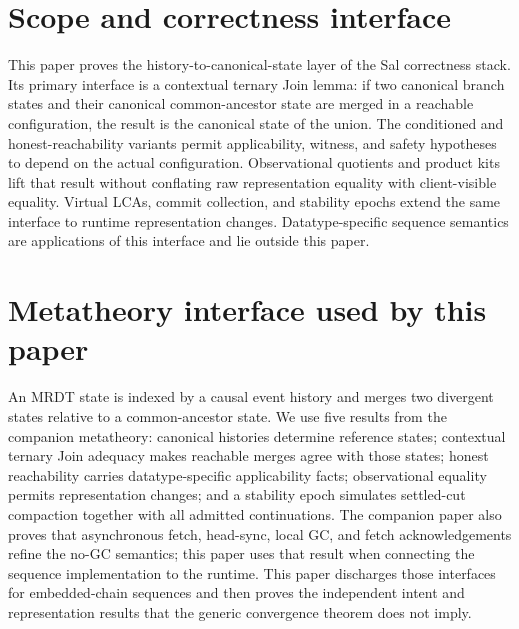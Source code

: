 \documentclass[11pt]{article}
\begin{document}
\ifdefined\salPaperA
\section*{Scope and correctness interface}
\label{sec:storage}
This paper proves the history-to-canonical-state layer of the Sal correctness
stack. Its primary interface is a contextual ternary Join lemma: if two
canonical branch states and their canonical common-ancestor state are merged
in a reachable configuration, the result is the canonical state of the union.
The conditioned and honest-reachability variants permit applicability,
witness, and safety hypotheses to depend on the actual configuration.
Observational quotients and product kits lift that result without conflating
raw representation equality with client-visible equality. Virtual LCAs,
commit collection, and stability epochs extend the same interface to runtime
representation changes. Datatype-specific sequence semantics are applications
of this interface and lie outside this paper.
\else\ifdefined\salPaperB
\section*{Metatheory interface used by this paper}
\label{def:delta}\label{def:honestreach}\label{fvc:cd}\label{fvc:lredist}
\label{sec:cvcs}\label{sec:gc}\label{sec:route}\label{sec:setting}
\label{sec:stability}\label{thm:evidence}\label{thm:gcsafety}
An MRDT state is indexed by a causal event history and merges two divergent
states relative to a common-ancestor state. We use five results from the
companion metatheory: canonical histories determine reference states;
contextual ternary Join adequacy makes reachable merges agree with those
states; honest reachability carries datatype-specific applicability facts;
observational equality permits representation changes; and a stability epoch
simulates settled-cut compaction together with all admitted continuations.
The companion paper also proves that asynchronous fetch, head-sync, local GC,
and fetch acknowledgements refine the no-GC semantics; this paper uses that
result when connecting the sequence implementation to the runtime.
This paper discharges those interfaces for embedded-chain sequences and then
proves the independent intent and representation results that the generic
convergence theorem does not imply.
\else
\end{document}
